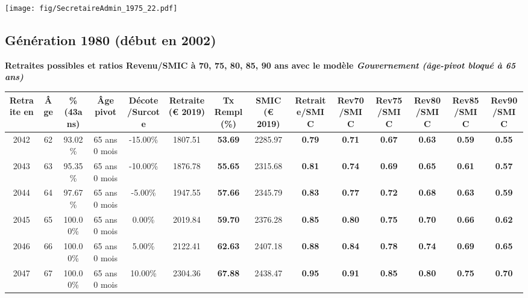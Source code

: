  \vspace{0.1cm} 

 \begin{center}\texttt{[image: fig/SecretaireAdmin\_1975\_22.pdf]}\end{center} \label{fig/SecretaireAdmin_1975_22.pdf} 

\newpage 
 
\subsection{Génération 1980 (début en 2002)} 

{\bf \noindent Retraites possibles et ratios Revenu/SMIC à 70, 75, 80, 85, 90 ans avec le modèle \emph{Gouvernement (âge-pivot bloqué à 65 ans)}}  
 
\begin{adjustbox}{max width=\textwidth} 
\begin{tabular}[htb]{|c|c||c|c|c||c|c||c||c|c|c|c|c|c|} 
\hline 
 Retraite en &  Âge &  \%(43ans) &  Âge pivot &  Décote/Surcote &  Retraite (\euro{} 2019) &  Tx Rempl(\%) &  SMIC (\euro{} 2019) &  Retraite/SMIC &  Rev70/SMIC &  Rev75/SMIC &  Rev80/SMIC &  Rev85/SMIC &  Rev90/SMIC \\ 
\hline \hline 
 2042 &  62 &  93.02\% &  65 ans 0 mois &  -15.00\% &  1807.51 &  {\bf 53.69} &  2285.97 &  {\bf {\color{red} 0.79}} &  {\bf {\color{red} 0.71}} &  {\bf {\color{red} 0.67}} &  {\bf {\color{red} 0.63}} &  {\bf {\color{red} 0.59}} &  {\bf {\color{red} 0.55}} \\ 
\hline 
 2043 &  63 &  95.35\% &  65 ans 0 mois &  -10.00\% &  1876.78 &  {\bf 55.65} &  2315.68 &  {\bf {\color{red} 0.81}} &  {\bf {\color{red} 0.74}} &  {\bf {\color{red} 0.69}} &  {\bf {\color{red} 0.65}} &  {\bf {\color{red} 0.61}} &  {\bf {\color{red} 0.57}} \\ 
\hline 
 2044 &  64 &  97.67\% &  65 ans 0 mois &  -5.00\% &  1947.55 &  {\bf 57.66} &  2345.79 &  {\bf {\color{red} 0.83}} &  {\bf {\color{red} 0.77}} &  {\bf {\color{red} 0.72}} &  {\bf {\color{red} 0.68}} &  {\bf {\color{red} 0.63}} &  {\bf {\color{red} 0.59}} \\ 
\hline 
 2045 &  65 &  100.00\% &  65 ans 0 mois &  0.00\% &  2019.84 &  {\bf 59.70} &  2376.28 &  {\bf {\color{red} 0.85}} &  {\bf {\color{red} 0.80}} &  {\bf {\color{red} 0.75}} &  {\bf {\color{red} 0.70}} &  {\bf {\color{red} 0.66}} &  {\bf {\color{red} 0.62}} \\ 
\hline 
 2046 &  66 &  100.00\% &  65 ans 0 mois &  5.00\% &  2122.41 &  {\bf 62.63} &  2407.18 &  {\bf {\color{red} 0.88}} &  {\bf {\color{red} 0.84}} &  {\bf {\color{red} 0.78}} &  {\bf {\color{red} 0.74}} &  {\bf {\color{red} 0.69}} &  {\bf {\color{red} 0.65}} \\ 
\hline 
 2047 &  67 &  100.00\% &  65 ans 0 mois &  10.00\% &  2304.36 &  {\bf 67.88} &  2438.47 &  {\bf {\color{red} 0.95}} &  {\bf {\color{red} 0.91}} &  {\bf {\color{red} 0.85}} &  {\bf {\color{red} 0.80}} &  {\bf {\color{red} 0.75}} &  {\bf {\color{red} 0.70}} \\ 
\hline 
\hline 
\end{tabular} 
\end{adjustbox} 
 
